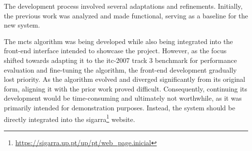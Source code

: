 The development process involved several adaptations and refinements. Initially, the previous work was analyzed and made functional, serving as a baseline for the new system. 

The \ac{mcts} algorithm was being developed while also being integrated into the front-end interface intended to showcase the project. However, as the focus shifted towards adapting it to the \ac{itc-2007} track 3 benchmark for performance evaluation and fine-tuning the algorithm, the front-end development gradually lost priority. As the algorithm evolved and diverged significantly from its original form, aligning it with the prior work proved difficult. Consequently, continuing its development would be time-consuming and ultimately not worthwhile, as it was primarily intended for demonstration purposes. Instead, the system should be directly integrated into the sigarra\footnote{\url{https://sigarra.up.pt/up/pt/web\_page.inicial}} website.



